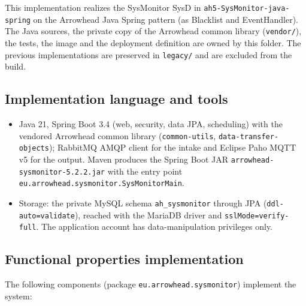 \documentclass[a4paper]{arrowhead}
\begin{document}
This implementation realizes the SysMonitor SysD in \texttt{ah5-\allowbreak{}SysMonitor-\allowbreak{}java-\allowbreak{}spring} on the Arrowhead Java Spring pattern (as Blacklist and EventHandler). The Java sources, the private copy of the Arrowhead common library (\texttt{vendor/}), the tests, the image and the deployment definition are owned by this folder. The previous implementations are preserved in \texttt{legacy/\allowbreak{}} and are excluded from the build.

\subsection{Implementation language and tools}
\begin{itemize}
\item Java 21, Spring Boot 3.4 (web, security, data JPA, scheduling) with the vendored Arrowhead common library (\texttt{common-\allowbreak{}utils}, \texttt{data-\allowbreak{}transfer-\allowbreak{}objects}); RabbitMQ AMQP client for the intake and Eclipse Paho MQTT v5 for the output. Maven produces the Spring Boot JAR \texttt{arrowhead-\allowbreak{}sysmonitor-\allowbreak{}5.2.2.jar} with the entry point \texttt{eu.\allowbreak{}arrowhead.\allowbreak{}sysmonitor.\allowbreak{}SysMonitorMain}.
\item Storage: the private MySQL schema \texttt{ah\_\allowbreak{}sysmonitor} through JPA (\texttt{ddl-\allowbreak{}auto=validate}), reached with the MariaDB driver and \texttt{sslMode=\allowbreak{}verify-\allowbreak{}full}. The application account has data-manipulation privileges only.
\end{itemize}

\subsection{Functional properties implementation}

The following components (package \texttt{eu.\allowbreak{}arrowhead.\allowbreak{}sysmonitor}) implement the system:
\end{document}
